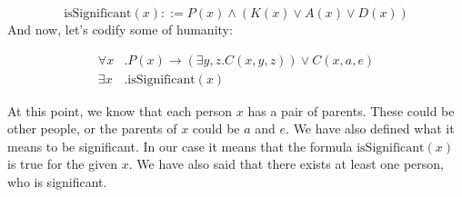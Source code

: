 $$
\text{isSignificant}(x) ::= P(x) \wedge \left(K(x) \vee A(x) \vee D(x)\right)
$$
And now, let's codify some of humanity:

$$
\begin{aligned}
  \forall x &. P(x) \rightarrow \left(\exists y,z . C(x, y, z)\right) \vee C(x, a, e)\\
  \exists x &. \text{isSignificant}(x)
\end{aligned}
$$

At this point, we know that each person $x$ has a pair of parents. These could be other people, or the parents of $x$
could be $a$ and $e$. We have also defined what it means to be significant. In our case it means that the formula $\text{isSignificant}(x)$
is true for the given $x$. We have also said that there exists at least one person, who is significant.